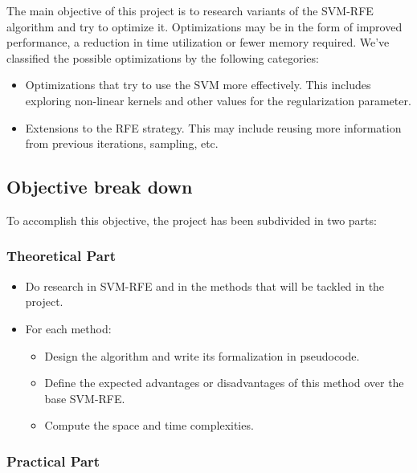 The main objective of this project is to research variants of the SVM-RFE algorithm and try to optimize it. Optimizations may be in the form of improved performance, a reduction in time utilization or fewer memory required. We've classified the possible optimizations by the following categories:

\begin{itemize}
    \item Optimizations that try to use the SVM more effectively. This includes exploring non-linear kernels and other values for the regularization parameter.
    \item Extensions to the RFE strategy. This may include reusing more information from previous iterations, sampling, etc. 
\end{itemize}

\subsection{Objective break down}

To accomplish this objective, the project has been sub\-divided in two parts:

\subsubsection*{Theoretical Part}

\begin{itemize}
    \item Do research in SVM-RFE and in the methods that will be tackled in the project.
    \item {
        For each method:
        \begin{itemize}
            \item Design the algorithm and write its formalization in pseudocode.
            \item Define the expected advantages or disadvantages of this method over the base SVM-RFE.
            \item Compute the space and time complexities.
        \end{itemize}
    }
\end{itemize}

\subsubsection*{Practical Part}

